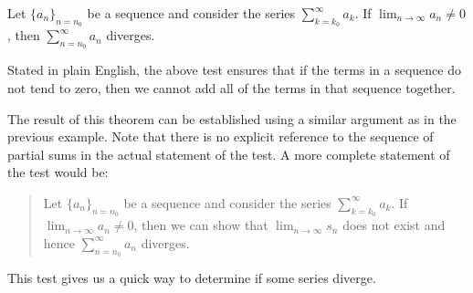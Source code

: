 \documentclass{ximera}
\begin{document}
%
%

\begin{theorem}
 Let $\{a_n\}_{n=n_0}$ be a sequence and consider the series $\sum_{k=k_0}^\infty a_k$.  If $\lim_{n\to\infty}a_n \neq 0$, then $\sum_{n=n_0}^\infty a_n$ diverges.
\end{theorem}

Stated in plain English, the above test ensures that if the terms in a sequence do not tend to zero, then we cannot add all of the terms in that sequence together.

\begin{remark}
The result of this theorem can be established using a similar argument as in the previous example.  Note that there is no explicit reference to the sequence of partial sums in the actual statement of the test.  A more complete statement of the test would be:

\begin{quote}
 Let $\{a_n\}_{n=n_0}$ be a sequence and consider the series $\sum_{k=k_0}^\infty a_k$.  If $\lim_{n\to\infty}a_n \neq 0$, then we can show that $\lim_{n \to \infty} s_n$ does not exist and hence $\sum_{n=n_0}^\infty a_n$ diverges.
\end{quote}

\end{remark}

This test gives us a quick way to determine if some series diverge.
\end{document}
